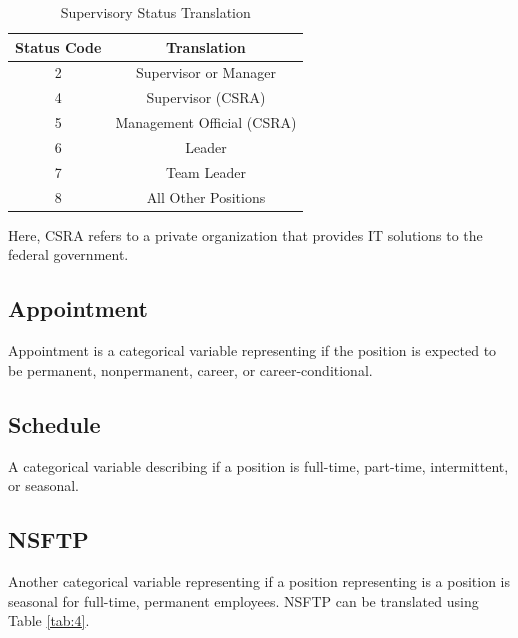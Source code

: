 \documentclass{article}
\begin{document}
        \begin{center}
            \begin{table}
                \centering
                \begin{tabular}{ |c|c| }
                    \hline
                    Status Code & Translation \\
                    \hline
                    2 & Supervisor or Manager \\
                    4 & Supervisor (CSRA) \\
                    5 & Management Official (CSRA) \\
                    6 & Leader \\
                    7 & Team Leader \\
                    8 & All Other Positions \\
                    \hline
                \end{tabular}
                \caption{Supervisory Status Translation}
                \label{tab:3}
            \end{table}
        \end{center}

    Here, CSRA refers to a private organization that provides IT solutions to the federal government.

    \subsection{Appointment}
    Appointment is a categorical variable representing if the position is expected to be permanent, nonpermanent, career, or career-conditional.

    \subsection{Schedule}
    A categorical variable describing if a position is full-time, part-time, intermittent, or seasonal.

    \subsection{NSFTP}
    Another categorical variable representing if a position representing is a position is seasonal for full-time, permanent employees. NSFTP can be translated using Table \ref{tab:4}.
\end{document}
